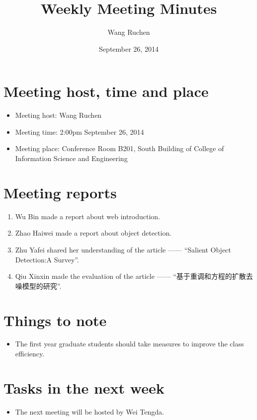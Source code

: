 \documentclass[a4paper，12pt]{article}
\title{Weekly Meeting Minutes}
\author{Wang Ruchen}
\date{September 26, 2014}
\begin{document}
\maketitle

\section{Meeting host, time and place}

\begin{itemize}
\item Meeting host: Wang Ruchen
\item Meeting time: 2:00pm September 26, 2014 
\item Meeting place: Conference Room B201, South Building of College of Information Science and Engineering 
\end{itemize}

\section{Meeting reports}

\begin{enumerate}
\item Wu Bin made a report about web introduction. 
\item Zhao Haiwei made a report about object detection.
\item Zhu Yafei shared her understanding of the article —— ``Salient Object Detection:A Survey''.
\item Qiu Xinxin made the evaluation of the article —— ``基于重调和方程的扩散去噪模型的研究''.
\end{enumerate}

\section {Things to note}

\begin{itemize}
\item The first year graduate students should take measures to improve the class efficiency.
\end{itemize}

\section {Tasks in the next week }

\begin{itemize}
\item The next meeting will be hosted by Wei Tengda.
\end{itemize}
\end{document}
